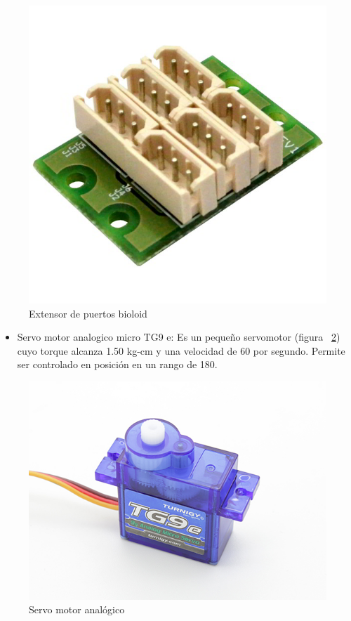 \begin{figure}[hbtp]
\centering
\label{fig:ext}
\includegraphics[scale=0.1]{imagenes/Dynamixel-AX-MX-6-Port-Extension-Hub-600x600.jpg}
\caption{Extensor de puertos bioloid}
\end{figure}

\begin{itemize}
\item Servo motor analogico micro TG9 e: Es un pequeño servomotor  (figura ~\ref{fig:Servo}) cuyo torque alcanza 1.50 kg-cm y una velocidad de 60 por segundo. Permite ser controlado en posición en un rango de 180. \cite{microservo}  

\end{itemize}

\begin{figure}[hbtp]
\centering
\label{fig:Servo}
\includegraphics[scale=0.1]{imagenes/turnigy.jpg}
\caption{Servo motor analógico}
\end{figure}

